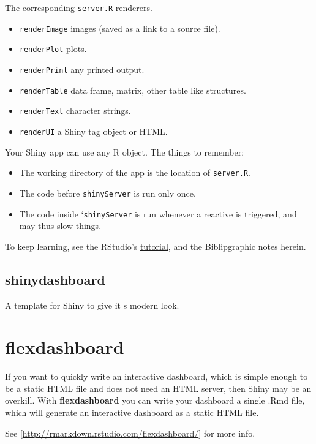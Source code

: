 \documentclass[]{book}
\providecommand{\tightlist}{%
  \setlength{\itemsep}{0pt}\setlength{\parskip}{0pt}}
\theoremstyle{definition}
\theoremstyle{definition}
\theoremstyle{definition}
\theoremstyle{remark}
\begin{document}
The corresponding \texttt{server.R} renderers.

\begin{itemize}
\tightlist
\item
  \texttt{renderImage} images (saved as a link to a source file).
\item
  \texttt{renderPlot} plots.
\item
  \texttt{renderPrint} any printed output.
\item
  \texttt{renderTable} data frame, matrix, other table like structures.
\item
  \texttt{renderText} character strings.
\item
  \texttt{renderUI} a Shiny tag object or HTML.
\end{itemize}

Your Shiny app can use any R object. The things to remember:

\begin{itemize}
\tightlist
\item
  The working directory of the app is the location of \texttt{server.R}.
\item
  The code before \texttt{shinyServer} is run only once.
\item
  The code inside `\texttt{shinyServer} is run whenever a reactive is
  triggered, and may thus slow things.
\end{itemize}

To keep learning, see the RStudio's
\href{http://shiny.rstudio.com/tutorial/}{tutorial}, and the
Biblipgraphic notes herein.

\subsection{shinydashboard}\label{shinydashboard}

A template for Shiny to give it s modern look.

\section{flexdashboard}\label{flexdashboard}

If you want to quickly write an interactive dashboard, which is simple
enough to be a static HTML file and does not need an HTML server, then
Shiny may be an overkill. With \textbf{flexdashboard} you can write your
dashboard a single .Rmd file, which will generate an interactive
dashboard as a static HTML file.

See {[}\url{http://rmarkdown.rstudio.com/flexdashboard/}{]} for more
info.
\end{document}
